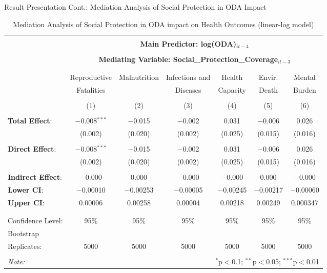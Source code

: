 \documentclass[aspectratio=169,handout, 10pt]{beamer}
\begin{document}
\begin{frame}{Result Presentation Cont.: Mediation Analysis of Social Protection in ODA Impact}
   \renewcommand{\arraystretch}{0.85} %
   
\footnotesize
\renewcommand{\arraystretch}{0.6} 
\begin{longtable}{@{\extracolsep{5pt}}lcccccc} 
\caption{Mediation Analysis of Social Protection in ODA impact on Health Outcomes (linear-log model)}
\\[-2ex]\hline 
\hline \\[-1ex] 
 & \multicolumn{6}{c}{\textbf{Main Predictor: log(ODA)$_{it-4}$}} \\
 & & & & & & \\ 
 & \multicolumn{6}{c}{\textbf{Mediating Variable: Social\_Protection\_Coverage$_{it-3}$}} \\
\cline{2-7} 
\\[-1.8ex] & \multicolumn{6}{c}{ } \\ 
 & Reproductive & Malnutrition  & Infections and & Health & Envir. & Mental\\
 & Fatalities & & Diseases & Capacity & Death & Burden \\
\\[-1.8ex] & (1) & (2) & (3) & (4) & (5) & (6)\\ 
\hline \\[-1ex] 
\textbf{Total Effect}: & $-$0.008$^{***}$ & $-$0.015 &$-$0.002 & 0.031 & $-$0.006 & 0.026 \\
 & (0.002)& (0.020)& (0.002)& (0.025) & (0.015)& (0.016)\\
 & & & & & & \\ 
 \textbf{Direct Effect}: & $-$0.008$^{***}$ & $-$0.015 & $-$0.002 & 0.031 & $-$0.006 & 0.026\\
 & (0.002) & (0.020) & (0.002) & (0.025) & (0.015)&  (0.016)\\
 & & & & & & \\  
 \textbf{Indirect Effect}: & $-$0.000 & 0.000 & $-$0.000 & $-$0.000 & 0.000 & $-$0.000\\
 \textbf{Lower CI}: & $-$0.00010 &$-$0.00253 &  $-$0.00005 & $-$0.00245  &  $-$0.00217 & $-$0.00060\\ 
\textbf{Upper CI}: & 0.00006 & 0.00258 & 0.00004 & 0.00218 & 0.00249 & 0.000347 \\
 & & & & & & \\ 
\hline \\[-1ex] 
Confidence Level: & 95\% & 95\% & 95\% & 95\% & 95\% & 95\%\\
Bootstrap &&&&&& \\
Replicates: & 5000 & 5000 & 5000 & 5000 & 5000 & 5000\\
\bottomrule
\hline \\[-1ex] 
\textit{Note:}  & \multicolumn{6}{r}{$^{*}$p$<$0.1; $^{**}$p$<$0.05; $^{***}$p$<$0.01} \\ 

\end{longtable}  
\end{frame}
\end{document}
